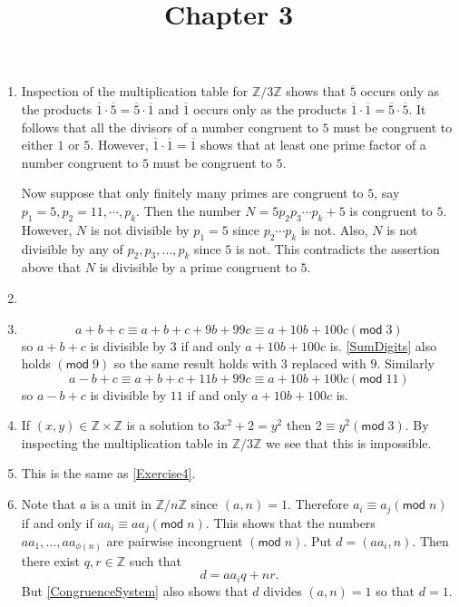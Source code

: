 \documentclass[12pt]{article}
\title{Chapter 3}
\author{}\date{}
\renewcommand{\pmod}[1]{\left(\mathsf{mod}\;#1\right)}
\begin{document}
\maketitle
\thispagestyle{empty}

\begin{enumerate}
\item %
Inspection of the multiplication table for $\mathbb{Z}/3\mathbb{Z}$
shows that $\overline{5}$ occurs only as the products
$\overline{1}\cdot\overline{5}=\overline{5}\cdot\overline{1}$
and $\overline{1}$ occurs only as the products
$\overline{1}\cdot\overline{1}=\overline{5}\cdot\overline{5}$.
It follows that all the divisors of a number congruent to $5$
must be congruent to either $1$ or $5$. However,
$\overline{1}\cdot\overline{1}=\overline{1}$ shows that
at least one prime factor of a number congruent to $5$
must be congruent to $5$.

Now suppose that only finitely many primes are congruent
to $5$, say $p_1=5,p_2=11,\cdots,p_k$. Then the number
$N=5p_2p_3\cdots p_k+5$ is congruent to $5$.
However, $N$ is not divisible by $p_1=5$ since $p_2\cdots p_k$
is not. Also, $N$ is not divisible by any of $p_2,p_3,\ldots,p_k$
since $5$ is not. This contradicts the assertion above that
$N$ is divisible by a prime congruent to $5$.

\item %
\item %
\begin{equation}\label{SumDigits}
a+b+c\equiv a+b+c+9b+99c\equiv a+10b+100c\pmod{3}
\end{equation}
so $a+b+c$ is divisible by $3$ if and only $a+10b+100c$
is. \autoref{SumDigits} also holds $\pmod{9}$ so the
same result holds with $3$ replaced with $9$. Similarly
\[a-b+c\equiv a+b+c+11b+99c\equiv a+10b+100c\pmod{11}\]
so $a-b+c$ is divisible by $11$ if and only $a+10b+100c$ is.

\item\label{Exercise4} %
If $\left(x,y\right)\in\mathbb{Z}\times\mathbb{Z}$
is a solution to $3x^2+2=y^2$ then $2\equiv y^2\pmod{3}$.
By inspecting the multiplication table
in $\mathbb{Z}/3\mathbb{Z}$ we see
that this is impossible.

\item %
This is the same as \autoref{Exercise4}.

\item\label{RRS} %
Note that $a$ is a unit in $\mathbb{Z}/n\mathbb{Z}$
since $\left(a,n\right)=1$. Therefore
$a_i\equiv a_j\pmod{n}$ if and only if $aa_i\equiv aa_j
\pmod{n}$. This shows that
the numbers $aa_1,\ldots,aa_{\phi\left(n\right)}$
are pairwise incongruent $\pmod{n}$. Put
$d=\left(aa_i,n\right)$. Then there exist $q,r\in\mathbb{Z}$
such that
\begin{equation}\label{CongruenceSystem}
d=aa_iq+nr.\end{equation}
But \autoref{CongruenceSystem} also shows that
$d$ divides $\left(a,n\right)=1$ so that $d=1$.


\end{enumerate}
\end{document}
